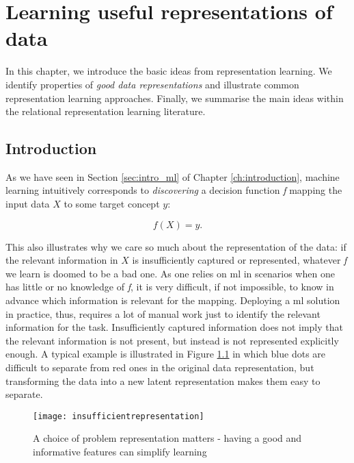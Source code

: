 \chapter{Learning useful representations of data}\label{ch:learningrepresentations}



In this chapter, we introduce the basic ideas from representation learning.
We identify properties of \textit{good data representations} and illustrate common representation learning approaches.
Finally, we summarise the main ideas within the relational representation learning literature.



\section{Introduction}


As we have seen in Section \ref{sec:intro_ml} of Chapter \ref{ch:introduction}, machine learning intuitively corresponds to \textit{discovering} a decision function \textit{f} mapping the input data $X$ to some target concept $y$:

\begin{equation}
	f(X) = y.
	\label{eq:ml}
\end{equation}


This also illustrates why we care so much about the representation of the data: if the relevant information in $X$ is insufficiently captured or represented, whatever \textit{f} we learn  is doomed to be a bad one.
As one relies on \gls{ml} in scenarios when one has little or no knowledge of \textit{f}, it is very difficult, if not impossible, to know in advance which information is relevant for the mapping.
Deploying a \gls{ml} solution in practice, thus, requires a lot of manual work just to identify the relevant information for the task.
Insufficiently captured information does not imply that the relevant information is not present, but instead is not represented explicitly enough.
A typical example is illustrated in Figure \ref{fig:transform} in which blue dots are difficult to separate from red ones in the original data representation, but transforming the data into a new latent representation makes them easy to separate.


\begin{figure}
	\centering
	\texttt{[image: insufficientrepresentation]}
	\caption[A choice of problem representation matters]{A choice of problem representation matters - having a good and informative features can simplify learning~\cite{Khanna}\label{fig:transform}}
\end{figure}

